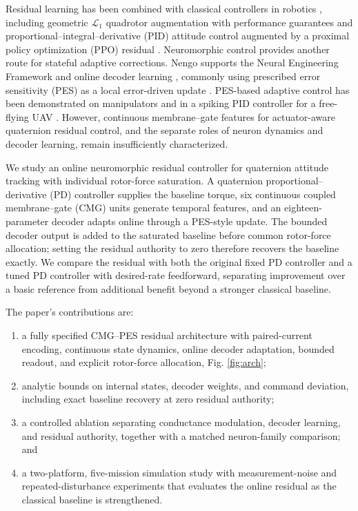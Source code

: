 \documentclass[letterpaper, 10 pt, conference]{ieeeconf}
\begin{document}
Residual learning has been combined with classical controllers in robotics
\cite{johannink2019}, including geometric $\mathcal L_1$ quadrotor
augmentation with performance guarantees \cite{wu2025l1quad} and
proportional--integral--derivative (PID) attitude control augmented by a
proximal policy optimization (PPO) residual \cite{li2027hpappo}. Neuromorphic
control provides another route for stateful adaptive corrections. Nengo
supports the Neural Engineering Framework and online decoder learning
\cite{bekolay2014nengo}, commonly using prescribed error sensitivity (PES) as
a local error-driven update \cite{voelker2015pes}. PES-based adaptive control
has been demonstrated on manipulators
\cite{dewolf2016arm,dewolf2020nengo} and in a spiking PID controller for a
free-flying UAV \cite{olivares2026selftuning}. However, continuous
membrane--gate features for actuator-aware quaternion residual control, and the
separate roles of neuron dynamics and decoder learning, remain insufficiently
characterized.


We study an online neuromorphic residual controller for quaternion attitude
tracking with individual rotor-force saturation. A quaternion
proportional--derivative (PD) controller supplies the baseline torque, six
continuous coupled membrane--gate (CMG) units generate temporal features, and
an eighteen-parameter decoder adapts online through a PES-style update. The
bounded decoder output is added to the saturated baseline before common
rotor-force allocation; setting the residual authority to zero therefore
recovers the baseline exactly. We compare the residual with both the original
fixed PD controller and a tuned PD controller with desired-rate feedforward,
separating improvement over a basic reference from additional benefit beyond a
stronger classical baseline.

The paper's contributions are:
\begin{enumerate}
    \item a fully specified CMG--PES residual architecture with paired-current
    encoding, continuous state dynamics, online decoder adaptation, bounded
    readout, and explicit rotor-force allocation, Fig. \ref{fig:arch};
    \item analytic bounds on internal states, decoder weights, and command
    deviation, including exact baseline recovery at zero residual authority;
    \item a controlled ablation separating conductance modulation, decoder
    learning, and residual authority, together with a matched neuron-family
    comparison; and
    \item a two-platform, five-mission simulation study with measurement-noise
    and repeated-disturbance experiments that evaluates the online residual as the
    classical baseline is strengthened.
\end{enumerate}
\end{document}
